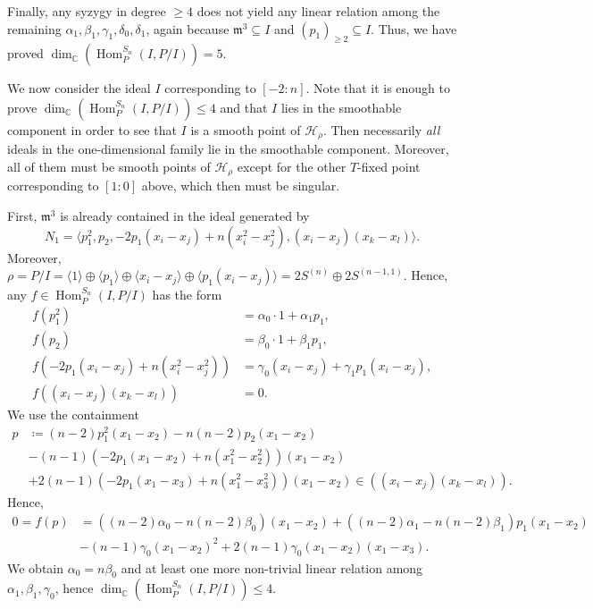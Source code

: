 \documentclass[11pt]{amsart}
\theoremstyle{definition}
\newcommand{\CC}{\mathbb{C}}
\newcommand{\mm}{\mathfrak{m}}
\newcommand{\HH}{\mathcal{H}}
\DeclareMathOperator{\Hom}{Hom}
\begin{document}
Finally, any syzygy in degree $\geq 4$ does not yield any linear relation among the remaining $\alpha_1,\beta_1,\gamma_1,\delta_0,\delta_1$, again because $\mm^3 \subseteq I$ and $(p_1)_{\geq 2} \subseteq I$. Thus, we have proved $\dim_\CC(\Hom^{S_n}_P(I,P/I)) = 5$.

\smallskip
We now consider the ideal $I$ corresponding to $[-2:n]$. Note that it is enough to prove $\dim_\CC(\Hom^{S_n}_P(I,P/I)) \leq 4$ and that $I$ lies in the smoothable component in order to see that $I$ is a smooth point of $\HH_\rho$. Then necessarily \emph{all} ideals in the one-dimensional family lie in the smoothable component. Moreover, all of them must be smooth points of $\HH_\rho$ except for the other $T$-fixed point corresponding to $[1:0]$ above, which then must be singular.

First, $\mm^3$ is already contained in the ideal generated by
\begin{equation*}
    N_1 = \langle p_1^2, p_2, -2p_1(x_i - x_j) + n(x_i^2 - x_j^2), (x_i-x_j)(x_k-x_l) \rangle.
\end{equation*}
Moreover, $\rho = P/I = \langle 1 \rangle \oplus \langle p_1 \rangle \oplus \langle x_i-x_j \rangle \oplus \langle p_1(x_i-x_j) \rangle = 2S^{(n)} \oplus 2S^{(n-1,1)}$.
Hence, any $f \in \Hom^{S_n}_{P}(I,P/I)$ has the form
\begin{align*}
    f(p_1^2) &= \alpha_0 \cdot 1 + \alpha_1 p_1, \\
    f(p_2) &= \beta_0 \cdot 1 + \beta_1 p_1, \\
    f(-2p_1(x_i-x_j) + n(x_i^2 - x_j^2)) &= \gamma_0 (x_i-x_j) + \gamma_1 p_1(x_i-x_j), \\
    f((x_i-x_j)(x_k-x_l)) &= 0.
\end{align*}
We use the containment
\begin{align*}
    p &\coloneqq (n-2) p_1^2(x_1-x_2) - n(n-2)p_2(x_1-x_2) \\ &- (n-1)(-2p_1(x_1-x_2)+n(x_1^2-x_2^2))(x_1-x_2) \\
    &+ 2(n-1)(-2p_1(x_1-x_3)+n(x_1^2-x_3^2))(x_1-x_2) \in ((x_i-x_j)(x_k-x_l)).
\end{align*}
Hence,
\begin{align*}
    0 = f(p) &= ((n-2)\alpha_0- n(n-2)\beta_0)(x_1-x_2) + ((n-2)\alpha_1 -n(n-2)\beta_1) p_1(x_1-x_2) \\ &- (n-1) \gamma_0 (x_1-x_2)^2 + 2(n-1) \gamma_0 (x_1-x_2)(x_1-x_3).
\end{align*}
We obtain $\alpha_0 = n \beta_0$ and at least one more non-trivial linear relation among $\alpha_1, \beta_1, \gamma_0$, hence $\dim_\CC(\Hom^{S_n}_P(I,P/I)) \leq 4$.
\end{document}
